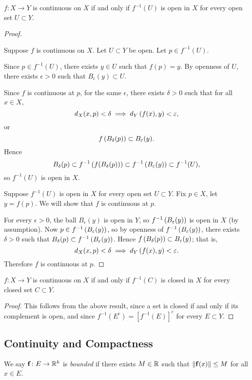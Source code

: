 \begin{lemma}\label{lemma:continuity-preimage-open}
$f\colon X\to Y$ is continuous on $X$ if and only if $f^{-1}(U)$ is open in $X$ for every open set $U\subset Y$.
\end{lemma}

\begin{proof} \

\fbox{$\implies$} Suppose $f$ is continuous on $X$. Let $U\subset Y$ be open. Let $p\in f^{-1}(U)$.

Since $p\in f^{-1}(U)$, there exists $y\in U$ such that $f(p)=y$. By openness of $U$, there exists $\epsilon>0$ such that $B_\epsilon(y)\subset U$. 

Since $f$ is continuous at $p$, for the same $\epsilon$, there exists $\delta>0$ such that for all $x\in X$,
\[d_X(x,p)<\delta\implies d_Y\left(f(x),y\right)<\varepsilon,\]
or
\[f\left(B_\delta(p)\right)\subset B_\varepsilon(y).\]
Hence
\[B_\delta(p)\subset f^{-1}\left(f(B_\delta(p))\right)\subset f^{-1}\left(B_\varepsilon(y)\right)\subset f^{-1}(U),\]
so $f^{-1}(U)$ is open in $X$.

\fbox{$\impliedby$} Suppose $f^{-1}(U)$ is open in $X$ for every open set $U\subset Y$. Fix $p\in X$, let $y=f(p)$. We will show that $f$ is continuous at $p$.

For every $\epsilon>0$, the ball $B_\epsilon(y)$ is open in $Y$, so $f^{-1}\left(B_\varepsilon(y)\right)$ is open in $X$ (by assumption). Now $p\in f^{-1}\left(B_\varepsilon(y)\right)$, so by openness of $f^{-1}\left(B_\varepsilon(y)\right)$, there exists $\delta>0$ such that $B_\delta(p)\subset f^{-1}\left(B_\varepsilon(y)\right)$. Hence $f\left(B_\delta(p)\right)\subset B_\varepsilon(y)$; that is,
\[d_X(x,p)<\delta\implies d_Y\left(f(x),y\right)<\varepsilon.\]
Therefore $f$ is continuous at $p$.
\end{proof}

\begin{corollary}\label{cor:continuity-preimage-closed}
$f\colon X\to Y$ is continuous on $X$ if and only if $f^{-1}(C)$ is closed in $X$ for every closed set $C\subset Y$.
\end{corollary}

\begin{proof}
This follows from the above result, since a set is closed if and only if its complement is open, and since $f^{-1}(E^c)=[f^{-1}(E)]^c$ for every $E\subset Y$.
\end{proof}
\pagebreak

\subsection{Continuity and Compactness}
We say $\vb{f}\colon E\to\mathbb R^k$ is \emph{bounded} if there exists $M\in\mathbb R$ such that $\norm{\vb{f}(x)}\le M$ for all $x\in E$.

